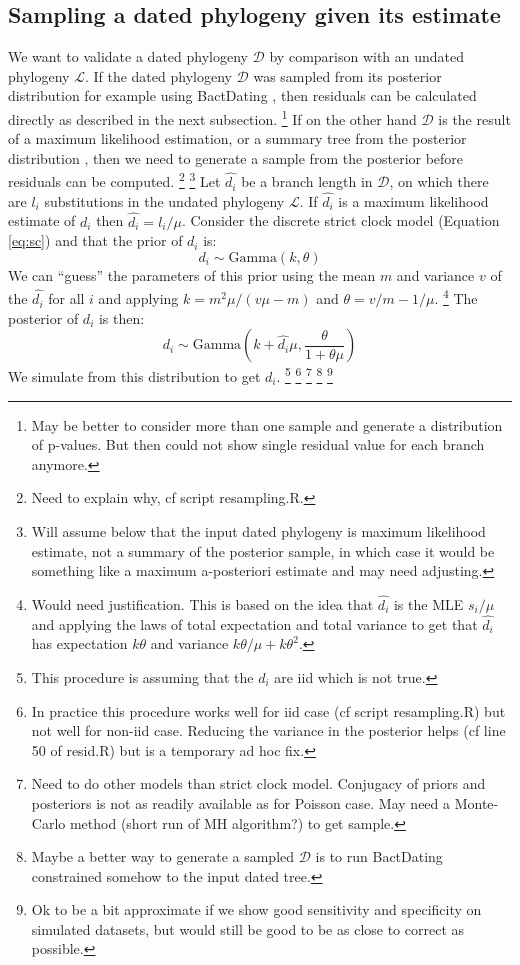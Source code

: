 \documentclass{article}
\begin{document}
\subsection*{Sampling a dated phylogeny given its estimate}

We want to validate a dated phylogeny $\mathcal{D}$ by comparison with an undated phylogeny $\mathcal{L}$. If the dated phylogeny $\mathcal{D}$ was sampled from its posterior distribution 
for example using BactDating \citep{Didelot2018}, 
then residuals can be calculated directly as described in the
next subsection.
\footnote{May be better to consider more than one sample and generate a distribution of p-values. But then could not show single residual value for each branch anymore.}
If on the other hand $\mathcal{D}$ is the result of a maximum likelihood estimation,
or a summary tree from the posterior distribution \citep{heledLookingTreesForest2013}, then 
we need to generate a sample from the posterior before residuals can be computed.
\footnote{Need to explain why, cf script resampling.R.}
\footnote{Will assume below that the input dated phylogeny is maximum likelihood estimate, not a summary of the posterior sample, in which case it would be something like a maximum a-posteriori estimate and may need adjusting.}
Let $\hat{d_i}$ be a branch length in $\mathcal{D}$, on which there are $l_i$ substitutions in the undated phylogeny $\mathcal{L}$. If $\hat{d_i}$ is a maximum likelihood estimate of $d_i$ then
$\hat{d_i}=l_i/\mu$.
Consider the discrete strict clock model (Equation \ref{eq:sc}) and that the prior of $d_i$ is:
\begin{equation}
d_i \sim \mathrm{Gamma}(k,\theta)
\end{equation}
We can ``guess'' the parameters of this prior using the 
mean $m$ and variance $v$ of the $\hat{d_i}$ for all $i$
and applying 
$k=m^2\mu/(v\mu-m)$ and $\theta=v/m-1/\mu$.
\footnote{Would need justification. This is based on the idea that $\hat{d_i}$ is the MLE
$s_i/\mu$ and applying the laws of total expectation and total variance to get that
$\hat{d_i}$ has expectation $k\theta$ and variance $k\theta/\mu+k\theta^2$.}
The posterior of $d_i$ is then:
\begin{equation}
d_i \sim \mathrm{Gamma}\left(k+\hat{d_i} \mu,\frac{\theta}{1+\theta \mu}\right)
\end{equation}
We simulate from this distribution to get $d_i$.
\footnote{This procedure is assuming that the $d_i$ are iid which is not true.}
\footnote{In practice this procedure works well for iid case (cf script resampling.R) but not well for non-iid case. Reducing the variance in the posterior helps (cf line 50 of resid.R) but is a temporary ad hoc fix. }
\footnote{Need to do other models than strict clock model. Conjugacy of priors and posteriors is not as readily available as for Poisson case. May need a Monte-Carlo method (short run of MH algorithm?) to get sample.}
\footnote{Maybe a better way to generate a sampled $\mathcal{D}$ is to run BactDating 
constrained somehow to the input dated tree.}
\footnote{Ok to be a bit approximate if we show good sensitivity and specificity on simulated datasets, but would still be good to be as close to correct as possible.}
\end{document}
